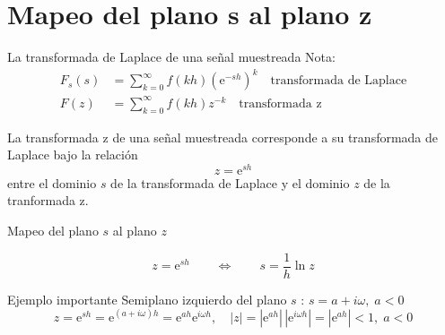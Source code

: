 \documentclass[presentation,aspectratio=169]{beamer}
\begin{document}
\section{Mapeo del plano s al plano z}
\label{sec:orgc17207c}
\begin{frame}[label={sec:org7d72952}]{La transformada de Laplace de una señal muestreada}
Nota:
\begin{align*}
F_s(s) &=  \sum_{k=0}^{\infty} f(kh) \left(\mathrm{e}^{-sh}\right)^k\quad \text{transformada de Laplace}\\
F(z) &= \sum_{k=0}^{\infty} f(kh) z^{-k} \quad \text{transformada z}
\end{align*}

\begin{tcolorbox}
La transformada z de una señal muestreada corresponde a su transformada de Laplace bajo la relación 
\[ z = \mathrm{e}^{sh}\]
entre el dominio $s$ de la transformada de Laplace y el dominio $z$ de la tranformada z.
\end{tcolorbox}
\end{frame}



\begin{frame}[label={sec:org3479c07}]{Mapeo del plano \(s\) al plano \(z\)}
\begin{tcolorbox}
\[ z = \mathrm{e}^{sh} \qquad \Leftrightarrow \qquad  s = \frac{1}{h} \ln z\]
\end{tcolorbox}

\alert{Ejemplo importante} Semiplano izquierdo del plano \(s\) : \(s = a + i\omega, \; a < 0\)
\[ z = \mathrm{e}^{sh} = \mathrm{e}^{(a + i\omega)h} = \mathrm{e}^{ah} \mathrm{e}^{i\omega h}, \quad |z| = |\mathrm{e}^{ah}|\, |\mathrm{e}^{i\omega h}| = |\mathrm{e}^{ah}| < 1, \; a < 0\]
\end{frame}
\end{document}

